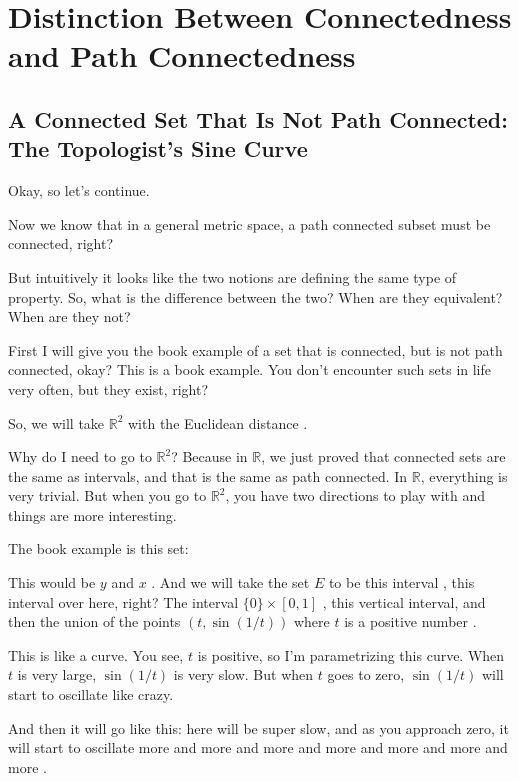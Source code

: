 \section{Distinction Between Connectedness and Path Connectedness}

\subsection{A Connected Set That Is Not Path Connected: The Topologist's Sine Curve}

\begin{speech}[00:43:48 - 00:45:11]
Okay, so let's continue.

Now we know that in a general metric space, a path connected subset must be connected, right?

But intuitively it looks like the two notions are defining the same type of property. So, what is the difference between the two? When are they equivalent? When are they not?

First I will give you the book example of a set that is connected, but is not path connected, okay? This is a book example. You don't encounter such sets in life very often, but they exist, right?

So, we will take $\mathbb{R}^2$ with the Euclidean distance .

Why do I need to go to $\mathbb{R}^2$? Because in $\mathbb{R}$, we just proved that connected sets are the same as intervals, and that is the same as path connected. In $\mathbb{R}$, everything is very trivial. But when you go to $\mathbb{R}^2$, you have two directions to play with and things are more interesting.
\end{speech}

\begin{speech}[00:45:11 - 00:46:41]
The book example is this set:

This would be $y$ and $x$ . And we will take the set $E$ to be this interval , this interval over here, right?  The interval $\{0\} \times [0, 1]$ , this vertical interval, and then the union of the points $(t, \sin(1/t))$ where $t$ is a positive number .

This is like a curve. You see, $t$ is positive, so I'm parametrizing this curve. When $t$ is very large, $\sin(1/t)$ is very slow. But when $t$ goes to zero, $\sin(1/t)$ will start to oscillate like crazy.

And then it will go like this: here will be super slow, and as you approach zero, it will start to oscillate more and more and more and more and more and more and more .
\end{speech}

